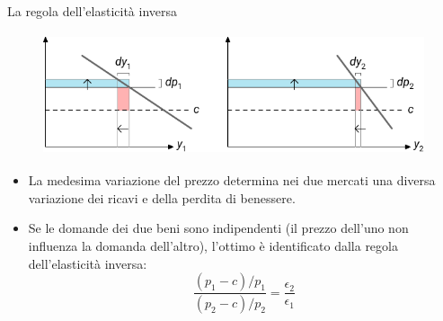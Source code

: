 \documentclass[aspectratio=64,12pt]{beamer}
\begin{document}
\begin{frame}{La regola dell'elasticità inversa}
\begin{figure}[htbp]
\centering
\includegraphics[height=3.6cm]{./figure/ramsey-3-color.pdf}
\end{figure}

\begin{itemize}
\item La medesima variazione del prezzo determina nei due mercati una diversa variazione dei ricavi e
della perdita di benessere.
\item Se le domande dei due beni sono indipendenti (il prezzo dell'uno non influenza la domanda dell'altro), l'ottimo è identificato dalla regola dell'elasticità inversa:
\begin{equation*}
\frac{(p_1-c)/p_1}{(p_2-c)/p_2}=\frac{\epsilon_2}{\epsilon_1}
\end{equation*}
\end{itemize}
\end{frame}
\end{document}
